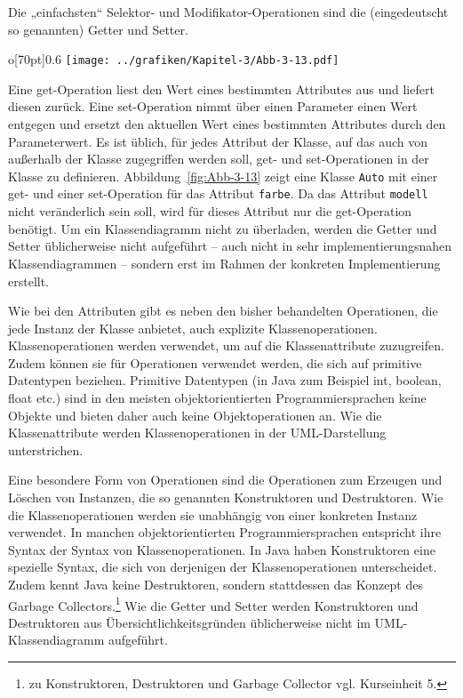 Die „einfachsten“ Selektor- und Modifikator-Operationen sind die (eingedeutscht so genannten) Getter und Setter. 
\begin{wrapfigure}{o}[70pt]{0.6\textwidth}
	\centering 
	\texttt{[image: ../grafiken/Kapitel-3/Abb-3-13.pdf]}
	\caption{Eine Klasse \texttt{Auto} mit get- und set-Operationen}
	\label{fig:Abb-3-13}
	\vspace{-6pt}
\end{wrapfigure}
Eine get-Operation liest den Wert eines bestimmten Attributes aus und liefert diesen zurück. 
Eine set-Operation nimmt über einen Parameter einen Wert entgegen und ersetzt den aktuellen Wert eines bestimmten Attributes durch den Parameterwert. Es ist üblich, für jedes Attribut der Klasse, auf das auch von außerhalb der Klasse zugegriffen werden soll, get- und set-Operationen in der Klasse zu definieren. Abbildung~\ref{fig:Abb-3-13} zeigt eine Klasse \texttt{Auto} mit einer get- und einer set-Operation für das Attribut \texttt{farbe}. Da das Attribut \texttt{modell} nicht veränderlich sein soll, wird für dieses Attribut nur die get-Operation benötigt. Um ein Klassendiagramm nicht zu überladen, werden die Getter und Setter üblicherweise nicht aufgeführt – auch nicht in sehr implementierungsnahen Klassendiagrammen – sondern erst im Rahmen der konkreten Implementierung erstellt.

Wie bei den Attributen gibt es neben den bisher behandelten Operationen, die jede Instanz der Klasse anbietet, auch explizite Klassenoperationen. Klassenoperationen werden verwendet, um auf die Klassenattribute zuzugreifen. Zudem können sie für Operationen verwendet werden, die sich auf primitive Datentypen beziehen. Primitive Datentypen (in Java zum Beispiel int, boolean, float etc.) sind in den meisten objektorientierten Programmiersprachen keine Objekte und bieten daher auch keine Objektoperationen an. Wie die Klassenattribute werden Klassenoperationen in der UML-Darstellung unterstrichen. 

Eine besondere Form von Operationen sind die Operationen zum Erzeugen und Löschen von Instanzen, die so genannten Konstruktoren und Destruktoren. Wie die Klassenoperationen werden sie unabhängig von einer konkreten Instanz verwendet. In manchen objektorientierten Programmiersprachen entspricht ihre Syntax der Syntax von Klassenoperationen. In Java haben Konstruktoren eine spezielle Syntax, die sich von derjenigen der Klassenoperationen unterscheidet. Zudem kennt Java keine Destruktoren, sondern stattdessen das Konzept des Garbage Collectors.\footnote{zu Konstruktoren, Destruktoren und Garbage Collector vgl. Kurseinheit 5.} Wie die Getter und Setter werden Konstruktoren und Destruktoren aus Übersichtlichkeitsgründen üblicherweise nicht im UML-Klassendiagramm aufgeführt.
